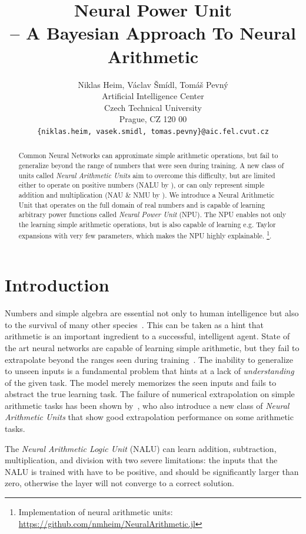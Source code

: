 \documentclass[9pt]{article}
\title{Neural Power Unit \\-- A Bayesian Approach To Neural Arithmetic}
\author{
  Niklas Heim,
  V\'aclav \v Sm\'idl,
  Tom\'a\v s Pevn\'y \\
  Artificial Intelligence Center\\
  Czech Technical University\\
  Prague, CZ 120 00\\
  \texttt{\{niklas.heim, vasek.smidl, tomas.pevny\}@aic.fel.cvut.cz}\\
}
\begin{document}
\maketitle

\begin{abstract}
  Common Neural Networks can approximate simple arithmetic operations, but fail
  to generalize beyond the range of numbers that were seen during training. A
  new class of units called \emph{Neural Arithmetic Units} aim to overcome this
  difficulty, but are limited either to operate on positive numbers (NALU by
  \citet{trask_neural_2018}), or can only represent simple addition and
  multiplication (NAU \& NMU by \citet{madsen_neural_2020}).  We introduce a
  Neural Arithmetic Unit that operates on the full domain of real numbers and
  is capable of learning arbitrary power functions called \emph{Neural Power
  Unit} (NPU). The NPU enables not only the learning simple arithmetic
  operations, but is also capable of learning e.g. Taylor expansions with very
  few parameters, which makes the NPU highly explainable.
  \footnote{Implementation of neural arithmetic units:
  \url{https://github.com/nmheim/NeuralArithmetic.jl}}.
\end{abstract}


\section{Introduction}%
\label{sec:introduction}

Numbers and simple algebra are essential not only to human intelligence but
also to the survival of many other
species~\citep{dehaene_number_2011,gallistel_finding_2018}.  This can be taken
as a hint that arithmetic is an important ingredient to a successful,
intelligent agent.  State of the art neural networks are capable of learning
simple arithmetic, but they fail to extrapolate beyond the ranges seen during
training~\citep{suzgun_evaluating_2018,lake_generalization_2018}.  The
inability to generalize to unseen inputs is a fundamental problem that hints at
a lack of \emph{understanding} of the given task. The model merely memorizes
the seen inputs and fails to abstract the true learning task.  The failure of
numerical extrapolation on simple arithmetic tasks has been shown
by~\cite{trask_neural_2018}, who also introduce a new class of \emph{Neural
Arithmetic Units} that show good extrapolation performance on some arithmetic
tasks.

The \emph{Neural Arithmetic Logic Unit} (NALU) can learn addition,
subtraction, multiplication, and division with two severe limitations: the
inputs that the NALU is trained with have to be positive, and should be
significantly larger than zero, otherwise the layer will not converge to
a correct solution.
\end{document}
